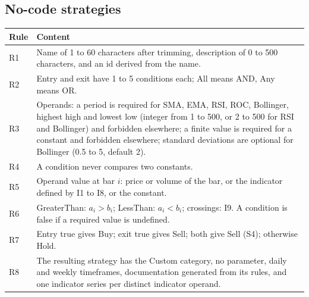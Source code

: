 \documentclass[11pt,a4paper]{article}
\begin{document}
\subsection*{No-code strategies}
\begin{longtable}{@{}p{0.9cm}p{14.8cm}@{}}
\toprule
\textbf{Rule} & \textbf{Content} \\
\midrule
\endhead
R1 & Name of 1 to 60 characters after trimming, description of 0 to 500 characters, and an id derived from the name. \\
R2 & Entry and exit have 1 to 5 conditions each; All means AND, Any means OR. \\
R3 & Operands: a period is required for SMA, EMA, RSI, ROC, Bollinger, highest high and lowest low (integer from 1 to 500, or 2 to 500 for RSI and Bollinger) and forbidden elsewhere; a finite value is required for a constant and forbidden elsewhere; standard deviations are optional for Bollinger (0.5 to 5, default 2). \\
R4 & A condition never compares two constants. \\
R5 & Operand value at bar $i$: price or volume of the bar, or the indicator defined by I1 to I8, or the constant. \\
R6 & GreaterThan: $a_i > b_i$; LessThan: $a_i < b_i$; crossings: I9. A condition is false if a required value is undefined. \\
R7 & Entry true gives Buy; exit true gives Sell; both give Sell (S4); otherwise Hold. \\
R8 & The resulting strategy has the Custom category, no parameter, daily and weekly timeframes, documentation generated from its rules, and one indicator series per distinct indicator operand. \\
\bottomrule
\end{longtable}
\end{document}
